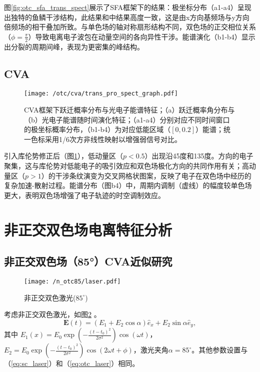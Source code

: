 图\ref{fig:otc_sfa_trans_spect}展示了SFA框架下的结果：极坐标分布（a1-a4）呈现出独特的鱼鳞干涉结构，此结果和中结果高度一致，这是由x方向基频场与y方向倍频场的相干叠加所致。与单色场的轴对称扇形结构不同，双色场的正交相位关系（$\phi = \frac{\pi}{2}$）导致电离电子波包在动量空间的各向异性干涉。能谱演化（b1-b4）显示出分裂的周期间峰，表现为更密集的峰结构。

\subsection{CVA}

\begin{figure}[!htbp]  %
	\centering
	\texttt{[image: /otc/cva/trans\_pro\_spect\_graph.pdf]}
	\caption{CVA框架下跃迁概率分布与光电子能谱特征；（a）跃迁概率角分布与（b）光电子能谱随时间演化特征；（a1-a4）分别对应不同时间窗口的极坐标概率分布，（b1-b4）为对应低能区域（$[0, 0.2]$）能谱；统一色标采用1/6次方非线性映射以增强弱信号对比。}
	\label{fig:otc_cva_trans_spect}
\end{figure}

引入库伦势修正后（图\ref{fig:otc_cva_trans_spect}），低动量区（$p<0.5$）出现沿45度和135度。方向的电子聚集，这与库伦势对低能电子的吸引效应和双色场极化方向的共同作用有关；高动量区（$p>1$）的干涉条纹演变为交叉网格状图案，反映了电子在双色场中经历的复杂加速-散射过程。能谱分布（图b4）中，周期内调制（虚线）的幅度较单色场更大，表明双色场增强了电子轨迹的时空调制效应。

%
\section{非正交双色场电离特征分析}
\subsection{非正交双色场（85°）CVA近似研究}

\begin{figure}[!htbp]  %
	\centering
	\texttt{[image: /n\_otc85/laser.pdf]}
	\caption{非正交双色激光($85^\circ$)}
	\label{fig:n_otc85_laser}
\end{figure}

考虑非正交双色激光，如图\ref{fig:n_otc85_laser} 。
\begin{equation}
	\mathbf{E}(t) = \left(E_1 + E_2\cos\alpha\right) \hat e_x + E_2\sin\alpha \hat e_y,
\end{equation}
其中 $E_1(x) = E_0 \exp\left(-\frac{(t - t_0)^2}{2\sigma^2}\right) \cos(\omega t)$，$E_2 = E_0 \exp\left(-\frac{(t - t_0)^2}{2\sigma^2}\right) \cos(2 \omega t + \phi)$，激光夹角$\alpha = 85^\circ$。其他参数设置与（\ref{eq:sc_laser}）和（\ref{eq:otc_laser}）相同。

